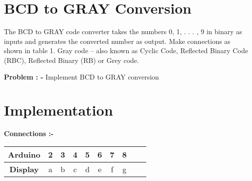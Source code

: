 \documentclass[10pt, a4paper]{article}
\title{\mytitle}
\author{\myauthor\hspace{1em}\\\contact\\FWC22039}
\begin{document}
	\maketitle
	\tableofcontents
	\begin{abstract}
	    This manual explains BCD to GRAY code conversion by finding boolean equations. \\
	   \end{abstract}
	  \section{BCD to GRAY Conversion}
The BCD to GRAY code converter takes the numbers 0, 1, . . . , 9 in binary as inputs and generates the converted number as output. Make connections as shown in table 1.
Gray code – also known as Cyclic Code, Reflected Binary Code (RBC), Reflected Binary (RB) or Grey code.

\textbf{Problem : -}
Implement BCD to GRAY conversion

   \section{Implementation}
 \textbf{Connections :-}
\begin{tabular}{|c|c|c|c|c|c|c|c|c|c|}
\hline
\textbf{Arduino} & 2 & 3 & 4 & 5 & 6 & 7 & 8  \\
\hline
\textbf{Display} & {a} & {b} & {c} & {d} & {e} & {f} & {g} \\
\hline
\end{tabular}
\end{document}
